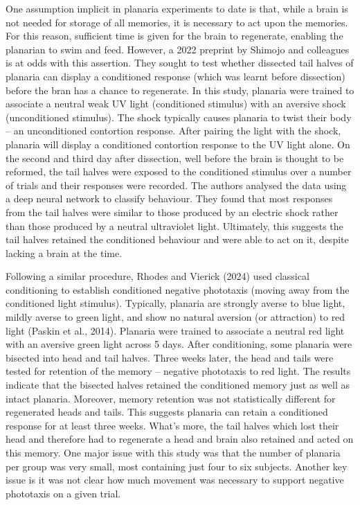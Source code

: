 \documentclass[
  letterpaper,
  DIV=11,
  numbers=noendperiod,
  oneside]{scrartcl}
\begin{document}
One assumption implicit in planaria experiments to date is that, while a
brain is not needed for storage of all memories, it is necessary to act
upon the memories. For this reason, sufficient time is given for the
brain to regenerate, enabling the planarian to swim and feed. However, a
2022 preprint by Shimojo and colleagues is at odds with this assertion.
They sought to test whether dissected tail halves of planaria can
display a conditioned response (which was learnt before dissection)
before the bran has a chance to regenerate. In this study, planaria were
trained to associate a neutral weak UV light (conditioned stimulus) with
an aversive shock (unconditioned stimulus). The shock typically causes
planaria to twist their body -- an unconditioned contortion response.
After pairing the light with the shock, planaria will display a
conditioned contortion response to the UV light alone. On the second and
third day after dissection, well before the brain is thought to be
reformed, the tail halves were exposed to the conditioned stimulus over
a number of trials and their responses were recorded. The authors
analysed the data using a deep neural network to classify behaviour.
They found that most responses from the tail halves were similar to
those produced by an electric shock rather than those produced by a
neutral ultraviolet light. Ultimately, this suggests the tail halves
retained the conditioned behaviour and were able to act on it, despite
lacking a brain at the time.

Following a similar procedure, Rhodes and Vierick (2024) used classical
conditioning to establish conditioned negative phototaxis (moving away
from the conditioned light stimulus). Typically, planaria are strongly
averse to blue light, mildly averse to green light, and show no natural
aversion (or attraction) to red light (Paskin et al., 2014). Planaria
were trained to associate a neutral red light with an aversive green
light across 5 days. After conditioning, some planaria were bisected
into head and tail halves. Three weeks later, the head and tails were
tested for retention of the memory -- negative phototaxis to red light.
The results indicate that the bisected halves retained the conditioned
memory just as well as intact planaria. Moreover, memory retention was
not statistically different for regenerated heads and tails. This
suggests planaria can retain a conditioned response for at least three
weeks. What's more, the tail halves which lost their head and therefore
had to regenerate a head and brain also retained and acted on this
memory. One major issue with this study was that the number of planaria
per group was very small, most containing just four to six subjects.
Another key issue is it was not clear how much movement was necessary to
support negative phototaxis on a given trial.
\end{document}
